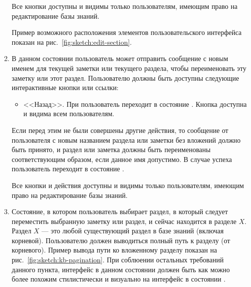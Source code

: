\begin{enumerate}
                Все кнопки доступны и видимы только пользователям, имеющим право на редактирование
                базы знаний.

                Пример возможного расположения элементов пользовательского интерфейса показан на
                рис.~\ref{fig:sketch:edit-section}.

            \item \label{itm:req:ui:states:rename-kbo}

                В данном состоянии пользователь может отправить сообщение с новым именем для
                текущей заметки или текущего раздела, чтобы переименовать эту заметку или этот раздел.
                Пользователю должны быть доступны следующие интерактивные кнопки или ссылки:
                \begin{itemize}
                    \item
                        <<Назад>>.
                        При  пользователь переходит в состояние
                        \hyperref[itm:req:ui:states:navx]
                        {}.
                        Кнопка доступна и видима всем пользователям.
                \end{itemize}
                Если перед этим не были совершены другие действия, то сообщение от пользователя
                с новым названием раздела или заметки без вложений должно быть принято,
                и раздел или заметка должны быть переименованы соответствующим образом,
                если данное имя допустимо.
                В случае успеха пользователь переходит в состояние
                \hyperref[itm:req:ui:states:navx]
                {}.

                Все кнопки и действия доступны и видимы только пользователям, имеющим право на редактирование
                базы знаний.

            \item \label{itm:req:ui:states:move-kbo}

                Состояние, в котором пользователь выбирает раздел, в который следует переместить
                выбранную заметку или раздел, и сейчас находится в разделе \(X\).
                Раздел \(X\) --- это любой существующий раздел в базе знаний (включая корневой).
                Пользователю должен выводиться полный путь к разделу (от корневого). Пример
                вывода пути ко вложенному разделу показан на рис.~\ref{fig:sketch:kb-pagination}.
                При соблюении остальных требований данного пункта, интерфейс в данном состоянии
                должен быть как можно более похожим стилистически и визуально на интерфейс
                в состоянии
                \hyperref[itm:req:ui:states:navx]
                {}.


\end{enumerate}
